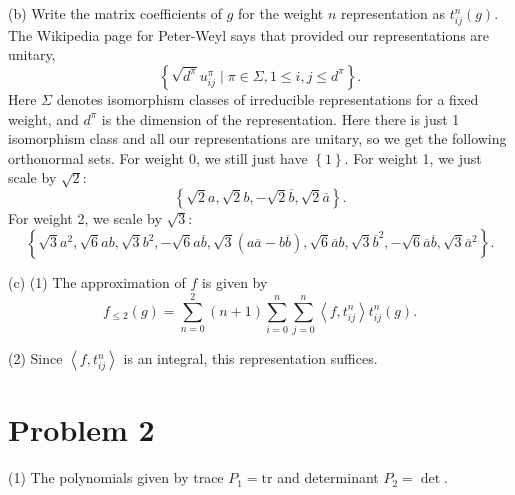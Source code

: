 \documentclass[11pt, letterpaper]{article}
\theoremstyle{plain}
\begin{document}
(b) Write the matrix coefficients of $g$ for the weight $n$ representation as $t_{ij}^n(g)$. The Wikipedia page for Peter-Weyl says that provided our representations are unitary,
\[
	\left\{ \sqrt{d^{\pi } } u_{ij} ^{\pi } \mid \pi\in\Sigma , 1\leq i,j\leq d^{\pi }  \right\} 
.\]
Here $\Sigma $ denotes isomorphism classes of irreducible representations for a fixed weight, and $d^{\pi } $ is the dimension of the representation. Here there is just 1 isomorphism class and all our representations are unitary, so we get the following orthonormal sets. For weight 0, we still just have $\left\{ 1 \right\} $. For weight 1, we just scale by $\sqrt{2} $:
\[
	\left\{ \sqrt{2} a,\sqrt{2} b,-\sqrt{2} \overline{b} ,\sqrt{2} \overline{a}  \right\} 
.\]
For weight 2, we scale by $\sqrt{3} $:
\[
	\left\{ \sqrt{3} a^2,\sqrt{6} ab,\sqrt{3} b^2,-\sqrt{6} a \overline{b} ,\sqrt{3} (a \overline{a} -b \overline{b} ), \sqrt{6} \overline{a} b,\sqrt{3} \overline{b} ^2,-\sqrt{6} \overline{a} \overline{b} ,\sqrt{3} \overline{a} ^2 \right\} 
.\]

(c) (1) The approximation of $f$ is given by
\[
	f_{\leq 2} (g) = \sum_{n=0}^{2}(n+1) \sum_{i=0}^{n} \sum_{j=0}^{n} \left\langle f,t^{n}_{ij}  \right\rangle t^n_{ij} (g)
.\]

(2) Since $\left\langle f,t^n_{ij}  \right\rangle $ is an integral, this representation suffices.



\section*{Problem 2}


(1) The polynomials given by trace $P_1 = \mathrm{tr} $ and determinant $P_2 = \det $.
\end{document}
